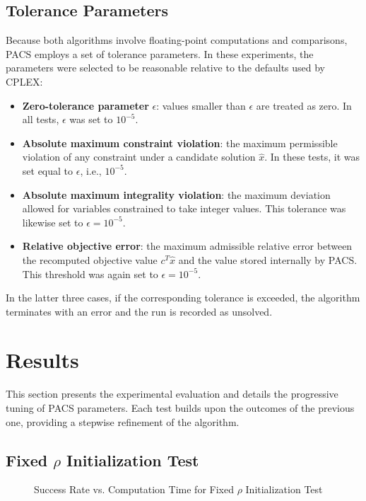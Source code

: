 \subsection{Tolerance Parameters}
Because both algorithms involve floating-point computations and comparisons, PACS employs a set of tolerance parameters. In these experiments, the parameters were selected to be reasonable relative to the defaults used by CPLEX:
\begin{itemize}
    \item \textbf{Zero-tolerance parameter} $\epsilon$: values smaller than $\epsilon$ are treated as zero. In all tests, $\epsilon$ was set to $10^{-5}$.
    \item \textbf{Absolute maximum constraint violation}: the maximum permissible violation of any constraint under a candidate solution $\hat{x}$. In these tests, it was set equal to $\epsilon$, i.e., $10^{-5}$.
    \item \textbf{Absolute maximum integrality violation}: the maximum deviation allowed for variables constrained to take integer values. This tolerance was likewise set to $\epsilon = 10^{-5}$.
    \item \textbf{Relative objective error}: the maximum admissible relative error between the recomputed objective value $c^T \hat{x}$ and the value stored internally by PACS. This threshold was again set to $\epsilon = 10^{-5}$.  
\end{itemize}  
In the latter three cases, if the corresponding tolerance is exceeded, the algorithm terminates with an error and the run is recorded as unsolved.  

\section{Results}
This section presents the experimental evaluation and details the progressive tuning of PACS parameters. Each test builds upon the outcomes of the previous one, providing a stepwise refinement of the algorithm.

\subsection{Fixed $\rho$ Initialization Test}\label{sec:test_fix_rho}

\begin{figure}[thpb]
    \centering
    \begin{minipage}{0.6\columnwidth}
        \centering
        \resizebox{\linewidth}{!}{}
    \end{minipage}%
    \hfill
    \begin{minipage}{0.4\columnwidth}
        \centering
        \resizebox{\linewidth}{!}{}
    \end{minipage}
    \caption{Success Rate vs. Computation Time for Fixed $\rho$ Initialization Test}
    \label{fig:PACS_STD_SuccRate}
\end{figure}


